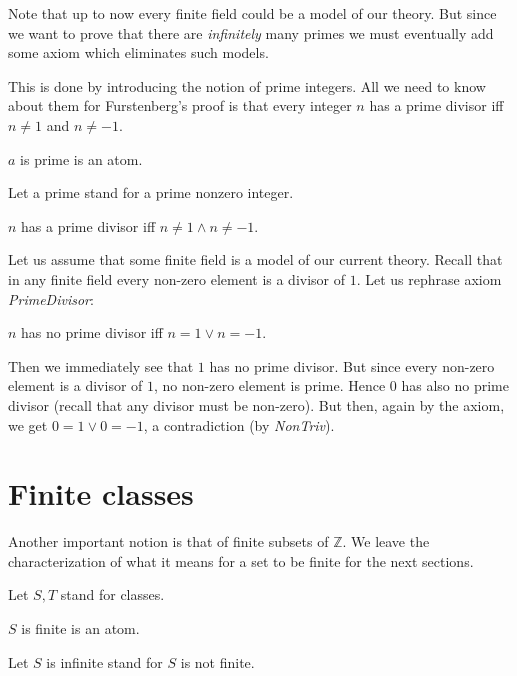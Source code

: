 \documentclass[english]{article}
\newcommand{\Int}{\mathbb{Z}}
\begin{document}
  Note that up to now every finite field could be a model of our theory. But since we want to prove
  that there are \textit{infinitely} many primes we must eventually add some axiom which eliminates
  such models.

  This is done by introducing the notion of prime integers. All we need to know about them for
  Furstenberg's proof is that every integer $n$ has a prime divisor iff $n \neq 1$ and $n \neq -1$.

  \begin{forthel}
    \begin{signature}\label{Prime}
      $a$ is prime is an atom.
    \end{signature}

    Let a prime stand for a prime nonzero integer.

    \begin{axiom}\label{PrimeDivisor}
      $n$ has a prime divisor iff $n \neq 1 \wedge n \neq -1$.
    \end{axiom}
  \end{forthel}

  Let us assume that some finite field is a model of our current theory. Recall that in any finite
  field every non-zero element is a divisor of $1$. Let us rephrase axiom \textit{PrimeDivisor}:

  \begin{center}
    $n$ has no prime divisor iff $n = 1 \vee n = -1$.
  \end{center}

  Then we immediately see that $1$ has no prime divisor. But since every non-zero element is a
  divisor of $1$, no non-zero element is prime. Hence $0$ has also no prime divisor (recall that any
  divisor must be non-zero). But then, again by the axiom, we get $0 = 1 \vee 0 = -1$, a
  contradiction (by \textit{NonTriv}).

  \section{Finite classes}

  Another important notion is that of finite subsets of $\Int$. We leave the characterization of
  what it means for a set to be finite for the next sections.

  \begin{forthel}
    Let $S,T$ stand for classes.

    \begin{signature}\label{FinSet}
      $S$ is finite is an atom.
    \end{signature}

    Let $S$ is infinite stand for $S$ is not finite.
  \end{forthel}
\end{document}
